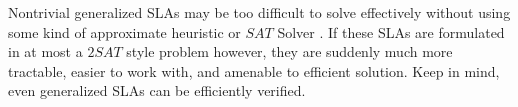Nontrivial generalized SLAs may be too difficult to solve effectively without using some kind of approximate heuristic or $ SAT $ Solver \cite{Hochbaum:1996:AAN:241938,ctrl:satcompetition}.  If these SLAs are formulated in at most a $ 2SAT $ style problem however, they are suddenly much more tractable, easier to work with, and amenable to efficient solution.  Keep in mind, even generalized SLAs can be efficiently verified.
